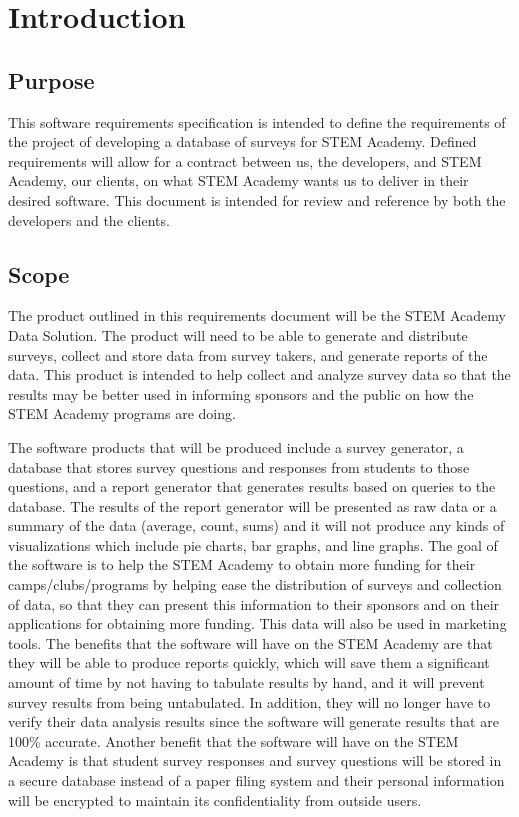 \newpage
\section{Introduction}
\subsection{Purpose}
This software requirements specification is intended to define the requirements of the project of developing a database 
of surveys for STEM Academy. Defined requirements will allow for a contract between us, the developers, and STEM Academy, 
our clients, on what STEM Academy wants us to deliver in their desired software. This document is intended for review and
reference by both the developers and the clients.
\subsection{Scope}
The product outlined in this requirements document will be the STEM Academy Data Solution. The product will need to be able
to generate and distribute surveys, collect and store data from survey takers, and generate reports of the data.  This product
is intended to help collect and analyze survey data so that the results may be better used in informing sponsors and the public on
how the STEM Academy programs are doing. 

The software products that will be produced include a survey generator, a database that stores survey questions and responses from students to those questions, and a report generator that generates results based on queries to the database.  
The results of the report generator will be presented as raw data or a summary of the data (average, count, sums) and it will not produce any kinds of visualizations which include pie charts, bar graphs, and line graphs.  
The goal of the software is to help the STEM Academy to obtain more funding for their camps/clubs/programs by helping ease the distribution of surveys and collection of data, so that they can present this information to their sponsors and on their applications for obtaining more funding. This data will also be used in marketing tools. 
The benefits that the software will have on the STEM Academy are that they will be able to produce reports quickly, which will save them a significant amount of time by not having to tabulate results by hand, and it will prevent survey results from being untabulated.
 In addition, they will no longer have to verify their data analysis results since the software will generate results that are 100\% accurate.
 Another benefit that the software will have on the STEM Academy is that student survey responses and survey questions will be stored in a secure database instead of a paper filing system and their personal information will be encrypted to maintain its confidentiality from outside users. 


